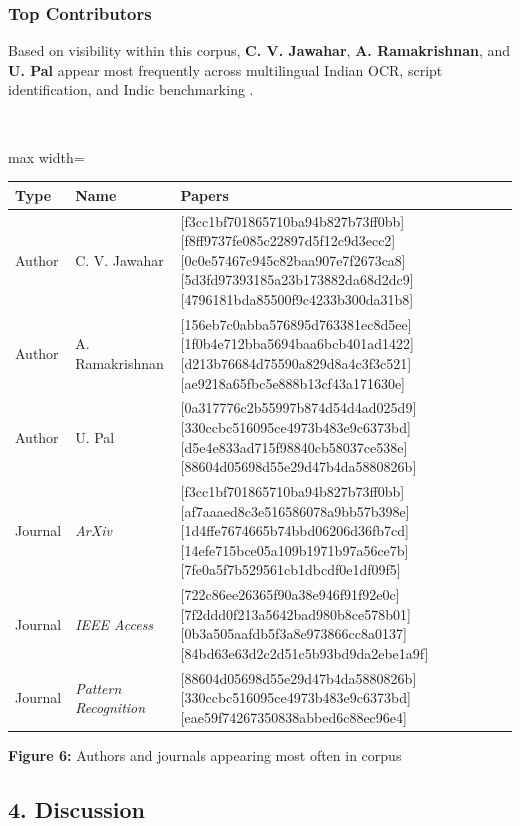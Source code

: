     
    \subsubsection*{Top Contributors}
    
    
    Based on visibility within this corpus, \textbf{C. V. Jawahar}, \textbf{A. Ramakrishnan}, and \textbf{U. Pal} appear most frequently across multilingual Indian OCR, script identification, and Indic benchmarking  \cite{Faraz2026Designing} \cite{ShivaKumarH.2019Lipi} \cite{Pal2004Indian}.
    
    
    \mbox{}\\
    \begin{adjustbox}{max width=\textwidth}
    \begin{tabular}{p{5.3cm} | p{5.3cm} | p{5.3cm}}
    \hline
    Type & Name & Papers \\
    \hline
    Author & C. V. Jawahar & [f3cc1bf701865710ba94b827b73ff0bb][f8ff9737fe085c22897d5f12c9d3ecc2][0c0e57467c945c82baa907e7f2673ca8][5d3fd97393185a23b173882da68d2dc9][4796181bda85500f9c4233b300da31b8] \\
    Author & A. Ramakrishnan & [156eb7c0abba576895d763381ec8d5ee][1f0b4e712bba5694baa6bcb401ad1422][d213b76684d75590a829d8a4c3f3c521][ae9218a65fbc5e888b13cf43a171630e] \\
    Author & U. Pal & [0a317776c2b55997b874d54d4ad025d9][330ccbc516095ce4973b483e9c6373bd][d5e4e833ad715f98840cb58037ce538e][88604d05698d55e29d47b4da5880826b] \\
    Journal & \textit{ArXiv} & [f3cc1bf701865710ba94b827b73ff0bb][af7aaaed8c3e516586078a9bb57b398e][1d4ffe7674665b74bbd06206d36fb7cd][14efe715bce05a109b1971b97a56ce7b][7fe0a5f7b529561cb1dbcdf0e1df09f5] \\
    Journal & \textit{IEEE Access} & [722c86ee26365f90a38e946f91f92e0c][7f2ddd0f213a5642bad980b8ce578b01][0b3a505aafdb5f3a8e973866cc8a0137][84bd63e63d2c2d51c5b93bd9da2ebe1a9f] \\
    Journal & \textit{Pattern Recognition} & [88604d05698d55e29d47b4da5880826b][330ccbc516095ce4973b483e9c6373bd][eae59f74267350838abbed6c88ec96e4] \\
    \hline
    \end{tabular}
    \end{adjustbox}
    
    
    \textbf{Figure 6:} Authors and journals appearing most often in corpus
    
    
    \subsection*{4. Discussion}
    
